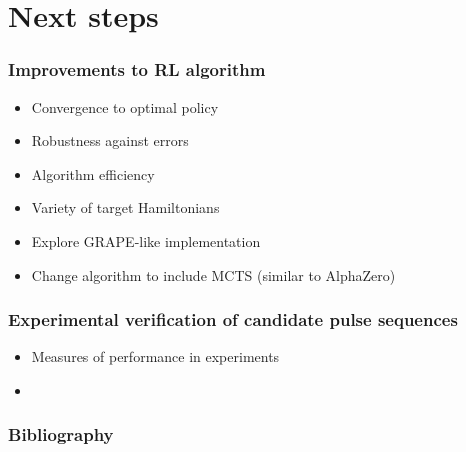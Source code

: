 \documentclass{beamer}
\begin{document}
\section{Next steps}

\begin{frame}
\frametitle{Improvements to RL algorithm}

\begin{itemize}
    \item Convergence to optimal policy
    \item Robustness against errors
    \item Algorithm efficiency
    \item Variety of target Hamiltonians
    \item Explore GRAPE-like implementation
    \pause
    \item Change algorithm to include MCTS (similar to AlphaZero)
\end{itemize}

\end{frame}

\begin{frame}
\frametitle{Experimental verification of candidate pulse sequences}

\begin{itemize}
    \item Measures of performance in experiments
    \item %
\end{itemize}

\end{frame}

\begin{frame}[allowframebreaks]
\frametitle{Bibliography}

\printbibliography

\end{frame}
\end{document}
